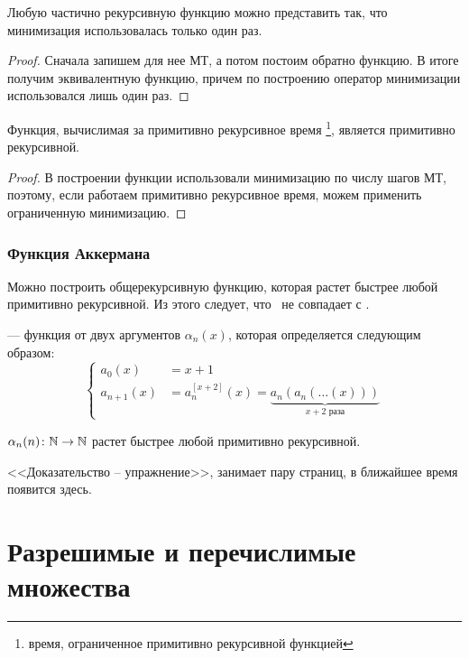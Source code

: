 \begin{cor}
    Любую частично рекурсивную функцию можно представить так, что минимизация использовалась только один раз.
\end{cor}
\begin{proof}
    Сначала запишем для нее МТ, а потом постоим обратно функцию. В итоге получим эквивалентную функцию, причем по построению оператор минимизации использовался лишь один раз.
\end{proof}
\begin{cor}
	Функция, вычислимая за примитивно рекурсивное время \footnote{время, ограниченное примитивно рекурсивной функцией}, является примитивно рекурсивной.
\end{cor}
\begin{proof}
    В построении функции использовали минимизацию по числу шагов МТ,  поэтому, если работаем примитивно рекурсивное время, можем применить ограниченную минимизацию. 
\end{proof}

\subsection{Функция Аккермана}
Можно построить общерекурсивную функцию, которая растет быстрее любой примитивно рекурсивной. Из этого следует, что \prf\ не совпадает с \orf.
\begin{defn}
	  --- функция от двух аргументов $ \alpha _n(x)$, которая определяется следующим образом:
	\[
		\begin{cases}
			a_0(x) &= x+1 \\ 
			a_{n+1}(x) &= a_{n}^{[x+2]}(x) = \underbrace{a_{n} (a_n( \ldots (x)))}_{x+2 \text{ раза}}  
		\end{cases}
	\] 
\end{defn}
\begin{thm}
	$ \alpha _{n}(n) \colon \mathbb{N} \to \mathbb{N}$  растет быстрее любой примитивно рекурсивной.
\end{thm}
\begin{proof*}
    <<Доказательство -- упражнение>>, занимает пару страниц, в ближайшее время появится здесь.
\end{proof*}

\chapter{Разрешимые и перечислимые множества}
